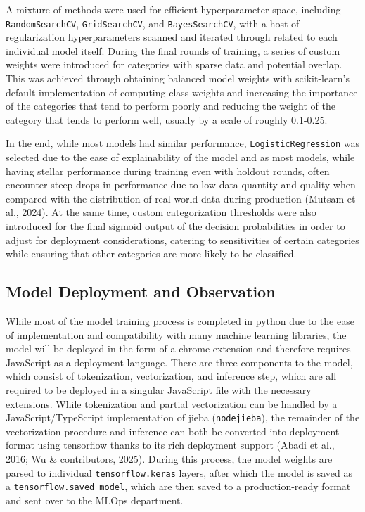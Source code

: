 \documentclass[
  titlepage]{article}
\begin{document}
A mixture of methods were used for efficient hyperparameter space,
including \texttt{RandomSearchCV}, \texttt{GridSearchCV}, and
\texttt{BayesSearchCV}, with a host of regularization hyperparameters
scanned and iterated through related to each individual model itself.
During the final rounds of training, a series of custom weights were
introduced for categories with sparse data and potential overlap. This
was achieved through obtaining balanced model weights with
scikit-learn's default implementation of computing class weights and
increasing the importance of the categories that tend to perform poorly
and reducing the weight of the category that tends to perform well,
usually by a scale of roughly 0.1-0.25.

In the end, while most models had similar performance,
\texttt{LogisticRegression} was selected due to the ease of
explainability of the model and as most models, while having stellar
performance during training even with holdout rounds, often encounter
steep drops in performance due to low data quantity and quality when
compared with the distribution of real-world data during production
(Mutsam et al., 2024). At the same time, custom categorization
thresholds were also introduced for the final sigmoid output of the
decision probabilities in order to adjust for deployment considerations,
catering to sensitivities of certain categories while ensuring that
other categories are more likely to be classified.

\subsection{Model Deployment and
Observation}\label{model-deployment-and-observation}

While most of the model training process is completed in python due to
the ease of implementation and compatibility with many machine learning
libraries, the model will be deployed in the form of a chrome extension
and therefore requires JavaScript as a deployment language. There are
three components to the model, which consist of tokenization,
vectorization, and inference step, which are all required to be deployed
in a singular JavaScript file with the necessary extensions. While
tokenization and partial vectorization can be handled by a
JavaScript/TypeScript implementation of jieba (\texttt{nodejieba}), the
remainder of the vectorization procedure and inference can both be
converted into deployment format using tensorflow thanks to its rich
deployment support (Abadi et al., 2016; Wu \& contributors, 2025).
During this process, the model weights are parsed to individual
\texttt{tensorflow.keras} layers, after which the model is saved as a
\texttt{tensorflow.saved\_model}, which are then saved to a
production-ready format and sent over to the MLOps department.
\end{document}
